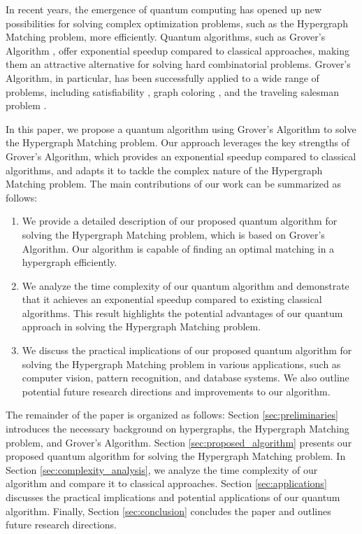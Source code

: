 In recent years, the emergence of quantum computing has opened up new possibilities for solving complex optimization problems, such as the Hypergraph Matching problem, more efficiently. Quantum algorithms, such as Grover's Algorithm \cite{grover}, offer exponential speedup compared to classical approaches, making them an attractive alternative for solving hard combinatorial problems. Grover's Algorithm, in particular, has been successfully applied to a wide range of problems, including satisfiability \cite{satisfiability}, graph coloring \cite{graph_coloring}, and the traveling salesman problem \cite{traveling_salesman}.

In this paper, we propose a quantum algorithm using Grover's Algorithm to solve the Hypergraph Matching problem. Our approach leverages the key strengths of Grover's Algorithm, which provides an exponential speedup compared to classical algorithms, and adapts it to tackle the complex nature of the Hypergraph Matching problem. The main contributions of our work can be summarized as follows:

\begin{enumerate}
    \item We provide a detailed description of our proposed quantum algorithm for solving the Hypergraph Matching problem, which is based on Grover's Algorithm. Our algorithm is capable of finding an optimal matching in a hypergraph efficiently.
    
    \item We analyze the time complexity of our quantum algorithm and demonstrate that it achieves an exponential speedup compared to existing classical algorithms. This result highlights the potential advantages of our quantum approach in solving the Hypergraph Matching problem.
    
    \item We discuss the practical implications of our proposed quantum algorithm for solving the Hypergraph Matching problem in various applications, such as computer vision, pattern recognition, and database systems. We also outline potential future research directions and improvements to our algorithm.
\end{enumerate}

The remainder of the paper is organized as follows: Section \ref{sec:preliminaries} introduces the necessary background on hypergraphs, the Hypergraph Matching problem, and Grover's Algorithm. Section \ref{sec:proposed_algorithm} presents our proposed quantum algorithm for solving the Hypergraph Matching problem. In Section \ref{sec:complexity_analysis}, we analyze the time complexity of our algorithm and compare it to classical approaches. Section \ref{sec:applications} discusses the practical implications and potential applications of our quantum algorithm. Finally, Section \ref{sec:conclusion} concludes the paper and outlines future research directions.

